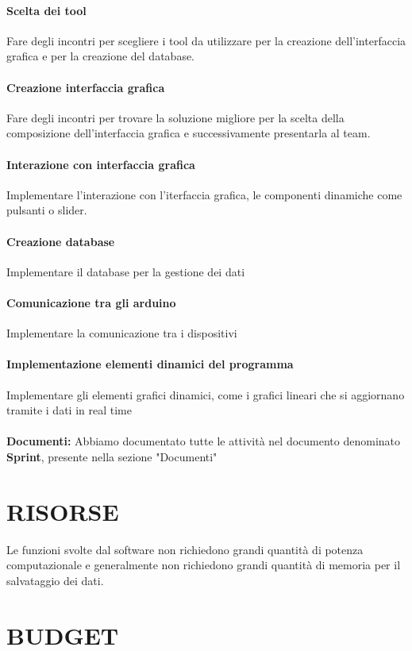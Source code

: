 \documentclass{report}
\begin{document}
\subsubsection{Scelta dei tool}
Fare degli incontri per scegliere i tool da utilizzare per la creazione dell'interfaccia grafica e per la creazione del database.
\subsubsection{Creazione interfaccia grafica}
Fare degli incontri per trovare la soluzione migliore per la scelta della composizione dell'interfaccia grafica e successivamente presentarla al team.
\subsubsection{Interazione con interfaccia grafica}
Implementare l'interazione con l'iterfaccia grafica, le componenti dinamiche come pulsanti o slider.
\subsubsection{Creazione database}
Implementare il database per la gestione dei dati
\subsubsection{Comunicazione tra gli arduino}
Implementare la comunicazione tra i dispositivi 
\subsubsection{Implementazione elementi dinamici del programma}
Implementare gli elementi grafici dinamici, come i grafici lineari che si aggiornano tramite i dati in real time\\\\
\textbf{Documenti:} Abbiamo documentato tutte le attività nel documento denominato \textbf{Sprint}, presente nella sezione "Documenti" 

\chapter{RISORSE}
Le funzioni svolte dal software non richiedono grandi quantità di potenza computazionale e generalmente non richiedono grandi quantità di memoria per il salvataggio dei dati.\\

\begingroup
\let\clearpage\relax
\chapter{BUDGET}
\endgroup
\end{document}
